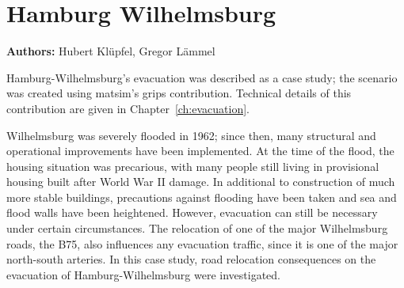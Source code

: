 \chapter{Hamburg Wilhelmsburg}
\label{ch:hhw}
\hfill \textbf{Authors:} Hubert Klüpfel, Gregor Lämmel


Hamburg-Wilhelmsburg's evacuation was described as a case study; the scenario was created using \gls{matsim}'s \gls{grips} \gls{contribution}. Technical details of this \gls{contribution} are given in Chapter~\ref{ch:evacuation}. 

Wilhelmsburg was severely flooded in 1962; since then, many structural and operational improvements have been implemented. At the time of the flood, the housing situation was precarious, with many people still living in provisional housing built after World War II damage. In additional to  construction of much more stable buildings, precautions against flooding have been taken and sea and flood walls have been heightened. However, evacuation can still be necessary under certain circumstances. The relocation of one of the major Wilhelmsburg roads, the B75, also influences any evacuation traffic, since it is one of the major north-south arteries. In this case study, road relocation consequences on the evacuation of Hamburg-Wilhelmsburg were investigated.

